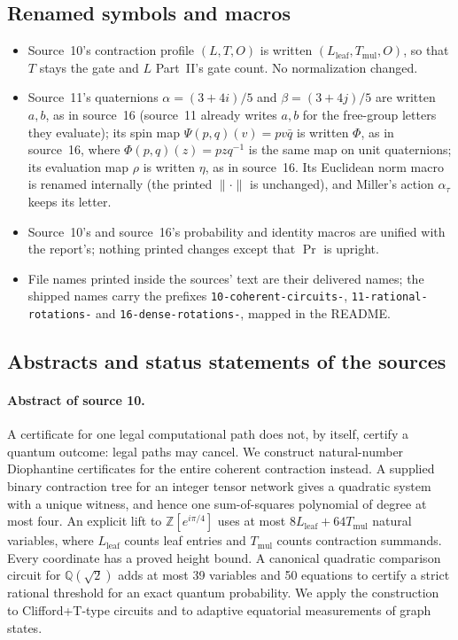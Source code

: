 \documentclass[11pt,letterpaper]{article}
\numberwithin{equation}{section}
\theoremstyle{definition}
\theoremstyle{remark}
\newcommand{\Z}{\mathbb Z}
\newcommand{\Q}{\mathbb Q}
\newcommand{\code}[1]{\nolinkurl{#1}}
\newcommand{\Lleaf}{L_{\mathrm{leaf}}}
\newcommand{\Tmul}{T_{\mathrm{mul}}}
\begin{document}
\subsection{Renamed symbols and macros}
\begin{itemize}
\item Source~10's contraction profile $(L,T,O)$ is written $(\Lleaf,\Tmul,O)$,
so that $T$ stays the gate and $L$ Part~II's gate count. No normalization
changed.
\item Source~11's quaternions $\alpha=(3+4i)/5$ and $\beta=(3+4j)/5$ are written
$a,b$, as in source~16 (source~11 already writes $a,b$ for the free-group letters
they evaluate); its spin map $\Psi(p,q)(v)=pv\bar q$ is written $\Phi$, as in
source~16, where $\Phi(p,q)(z)=pzq^{-1}$ is the same map on unit quaternions;
its evaluation map $\rho$ is written $\eta$, as in source~16. Its Euclidean norm
macro is renamed internally (the printed $\lVert\cdot\rVert$ is unchanged), and
Miller's action $\alpha_\tau$ keeps its letter.
\item Source~10's and source~16's probability and identity macros are unified
with the report's; nothing printed changes except that $\Pr$ is upright.
\item File names printed inside the sources' text are their delivered names;
the shipped names carry the prefixes \code{10-coherent-circuits-},
\code{11-rational-rotations-} and \code{16-dense-rotations-}, mapped in the
README.
\end{itemize}

\subsection{Abstracts and status statements of the sources}
\paragraph{Abstract of source 10.}
A certificate for one legal computational path does not, by itself, certify a
quantum outcome: legal paths may cancel. We construct natural-number
Diophantine certificates for the entire coherent contraction instead. A supplied
binary contraction tree for an integer tensor network gives a quadratic system
with a unique witness, and hence one sum-of-squares polynomial of degree at most
four. An explicit lift to $\Z[e^{i\pi/4}]$ uses at most $8\Lleaf+64\Tmul$ natural variables,
where $\Lleaf$ counts leaf entries and $\Tmul$ counts contraction summands. Every coordinate
has a proved height bound. A canonical quadratic comparison circuit for
$\Q(\sqrt2)$ adds at most 39 variables and 50 equations to certify a strict
rational threshold for an exact quantum probability. We apply the construction
to Clifford+T-type circuits and to adaptive equatorial measurements of graph
states.
\end{document}
